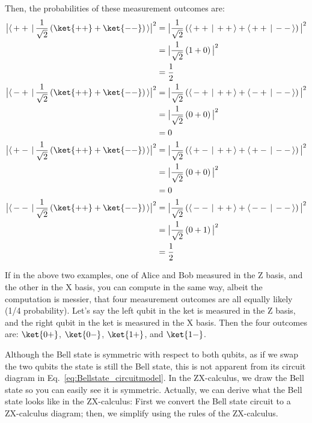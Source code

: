\documentclass{article}
\theoremstyle{definition}
\newcommand{\abs}[1]{{\big\vert} #1 {\big\vert}}
\newcommand{\kx}[1]{\ket{#1}}
\begin{document}
\begin{example}
	\textnormal{Then, the probabilities of these measurement outcomes are:}
	\begin{align}
		\abs{\langle \,++\,|\,\frac{1}{\sqrt{2}} \left(\kx{++} + \kx{--}\right)\,\rangle}^2 &= \abs{\frac{1}{\sqrt{2}}\left( \langle \,++\,|\,++\,\rangle + \langle \,++\,|\,--\,\rangle \right)}^2\\
		&= \abs{\frac{1}{\sqrt{2}}\left( 1 + 0 \right)}^2\\
		&= \frac{1}{2}\\
		\abs{\langle \,-+\,|\,\frac{1}{\sqrt{2}} \left(\kx{++} + \kx{--}\right)\,\rangle}^2 &= \abs{\frac{1}{\sqrt{2}}\left( \langle \,-+\,|\,++\,\rangle + \langle \,-+\,|\,--\,\rangle \right)}^2\\
		&= \abs{\frac{1}{\sqrt{2}}\left( 0 + 0 \right)}^2\\
		&= 0\\
		\abs{\langle \,+-\,|\,\frac{1}{\sqrt{2}} \left(\kx{++} + \kx{--}\right)\,\rangle}^2 &= \abs{\frac{1}{\sqrt{2}}\left( \langle \,+-\,|\,++\,\rangle + \langle \,+-\,|\,--\,\rangle \right)}^2\\
		&= \abs{\frac{1}{\sqrt{2}}\left( 0 + 0 \right)}^2\\
		&= 0\\
		\abs{\langle \,--\,|\,\frac{1}{\sqrt{2}} \left(\kx{++} + \kx{--}\right)\,\rangle}^2 &= \abs{\frac{1}{\sqrt{2}}\left( \langle \,--\,|\,++\,\rangle + \langle \,--\,|\,--\,\rangle \right)}^2\\
		&= \abs{\frac{1}{\sqrt{2}}\left( 0 + 1 \right)}^2\\
		&= \frac{1}{2}
	\end{align}
\end{example}

If in the above two examples, one of Alice and Bob measured in the Z basis, and the other in the X basis, you can compute in the same way, albeit the computation is messier, that four measurement outcomes are all equally likely (1/4 probability).  Let's say the left qubit in the ket is measured in the Z basis, and the right qubit in the ket is measured in the X basis.  Then the four outcomes are: $\kx{0+}$, $\kx{0-}$, $\kx{1+}$, and $\kx{1-}$.

Although the Bell state is symmetric with respect to both qubits, as if we swap the two qubits the state is still the Bell state, this is not apparent from its circuit diagram in Eq.~\eqref{eq:Bellstate_circuitmodel}.  In the ZX-calculus, we draw the Bell state so you can easily see it is symmetric.  Actually, we can derive what the Bell state looks like in the ZX-calculus: First we convert the Bell state circuit to a ZX-calculus diagram; then, we simplify using the rules of the ZX-calculus.
\end{document}
